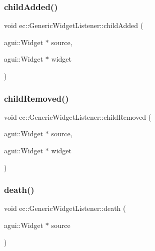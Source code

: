 \subsubsection{\texorpdfstring{child\+Added()}{childAdded()}}
{\footnotesize\ttfamily void ec\+::\+Generic\+Widget\+Listener\+::child\+Added (\begin{DoxyParamCaption}\item[{agui\+::\+Widget $\ast$}]{source,  }\item[{agui\+::\+Widget $\ast$}]{widget }\end{DoxyParamCaption})\hspace{0.3cm}{\ttfamily [override]}}

\mbox{\label{classec_1_1_generic_widget_listener_a504f50b49890512df4694b3fd4bfa2a2}} 
\subsubsection{\texorpdfstring{child\+Removed()}{childRemoved()}}
{\footnotesize\ttfamily void ec\+::\+Generic\+Widget\+Listener\+::child\+Removed (\begin{DoxyParamCaption}\item[{agui\+::\+Widget $\ast$}]{source,  }\item[{agui\+::\+Widget $\ast$}]{widget }\end{DoxyParamCaption})\hspace{0.3cm}{\ttfamily [override]}}

\mbox{\label{classec_1_1_generic_widget_listener_a528f121d3af10fea1e966a5d8baa86f5}} 
\subsubsection{\texorpdfstring{death()}{death()}}
{\footnotesize\ttfamily void ec\+::\+Generic\+Widget\+Listener\+::death (\begin{DoxyParamCaption}\item[{agui\+::\+Widget $\ast$}]{source }\end{DoxyParamCaption})\hspace{0.3cm}{\ttfamily [override]}}

